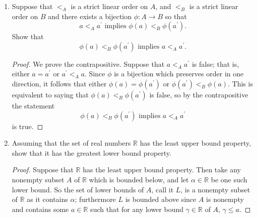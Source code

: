 \documentclass[11pt]{article}
\begin{document}
\begin{enumerate}
\begin{proof}
        Transitivity: Suppose $(a_1, b_1) < (a_2, b_2)$, so that $a_1 <_A a_2$ or $a_1 = a_2\land b_1 <_B b_2$; suppose also that $(a_2, b_2) < (a_3, b_3)$, so that $a_2 <_A a_3$ or $a_2 = a_3\land b_2<_Bb_3$. These statements yield four cases, each of which imply transitivity: \begin{enumerate}[label=(\arabic*)]
            \item Suppose that $a_1 <_A a_2$ and $a_2 <_A a_3$, so that due to the total ordering on $A$, $a_1 <_A a_3$. It follows that $(a_1,b_1) < (a_3, b_3)$.
            \item Suppose that $a_1 <_A a_2$ and $a_2 = a_3\land b_2<_Bb_3$, which again from the total ordering on $A$ imply that $a_1 <_A a_3$. It follows that $(a_1,b_1) < (a_3, b_3)$.
            \item Suppose that $a_1 = a_2\land b_1 <_B b_2$ and $a_2 <_A a_3$, so that $a_1 <_A a_3$. Again $(a_1,b_1) < (a_3, b_3)$.
            \item Suppose that $a_1 = a_2\land b_1 <_B b_2$ and $a_2 = a_3\land b_2<_Bb_3$, so that by the total ordering on $B$, $b_1 <_B b_3$. It also follows that $a_1 = a_3$, and so it follows that $(a_1,b_1) < (a_3, b_3)$.
        \end{enumerate} Thus the dictionary order on $A\times B$ is transitive.

        Hence the dictionary order on $A\times B$ is a total ordering.
    \end{proof}
    \item Suppose that $<_A$ is a strict linear order on $A$, and $<_B$ is a strict linear order on $B$ and there exists a bijection $\phi\colon A\to B$ so that \[a <_A a^{\prime} \text{ implies } \phi(a) <_B \phi(a^{\prime}).\] Show that \[\phi(a) <_B \phi(a^{\prime}) \text{ implies } a <_A a^{\prime}.\]
    \begin{proof}
        We prove the contrapositive. Suppose that $a <_A a^{\prime}$ is false; that is, either $a = a^{\prime}$ or $a^{\prime}<_A a$. Since $\phi$ is a bijection which preserves order in one direction, it follows that either $\phi(a) = \phi(a^{\prime})$ or $\phi(a^{\prime}) <_B \phi(a)$. This is equivalent to saying that $\phi(a) <_B \phi(a^{\prime})$ is false, so by the contrapositive the statement \[\phi(a) <_B \phi(a^{\prime}) \text{ implies } a <_A a^{\prime}\] is true.
    \end{proof}
    \item Assuming that the set of real numbers $\mathbb{R}$ has the least upper bound property, show that it has the greatest lower bound property.
    \begin{proof}
        Suppose that $\mathbb{R}$ has the least upper bound property. Then take any nonempty subset $A$ of $\mathbb{R}$ which is bounded below, and let $\alpha\in \mathbb{R}$ be one such lower bound. So the set of lower bounds of $A$, call it $L$, is a nonempty subset of $\mathbb{R}$ as it contains $\alpha$; furthermore $L$ is bounded above since $A$ is nonempty and contains some $a\in\mathbb{R}$ such that for any lower bound $\gamma\in \mathbb{R}$ of $A$, $\gamma\leq a$.


\end{proof}
\end{enumerate}
\end{document}
